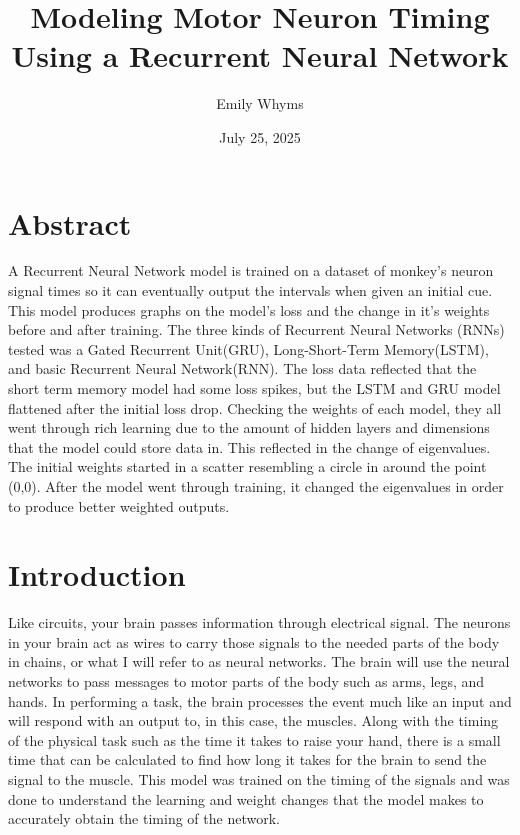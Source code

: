 \documentclass{article}
\title{\bf \fontsize{25 pt}{25 pt} Modeling Motor Neuron Timing Using a Recurrent Neural Network}
\author{Emily Whyms}
\date{July 25, 2025}
\begin{document}
\maketitle

\section{Abstract\centering}
A Recurrent Neural Network model is trained on a dataset\cite{Wang2018} of monkey's neuron signal times so it can eventually output the intervals when given an initial cue. This model produces graphs on the model's loss and the change in it's weights before and after training. The three kinds of Recurrent Neural Networks (RNNs) tested was a Gated Recurrent Unit(GRU), Long-Short-Term Memory(LSTM), and basic Recurrent Neural Network(RNN). The loss data reflected that the short term memory model had some loss spikes, but the LSTM and GRU model flattened after the initial loss drop. Checking the weights of each model, they all went through rich learning due to the amount of hidden layers and dimensions that the model could store data in. This reflected in the change of eigenvalues. The initial weights started in a scatter resembling a circle in around the point (0,0). After the model went through training, it changed the eigenvalues in order to produce better weighted outputs.
\section{Introduction\centering}
Like circuits, your brain passes information through electrical signal. The neurons in your brain act as wires to carry those signals to the needed parts of the body in chains, or what I will refer to as neural networks. The brain will use the neural networks to pass messages to motor parts of the body such as arms, legs, and hands. In performing a task, the brain processes the event much like an input and will respond with an output to, in this case, the muscles\cite{ScottS2004}. Along with the timing of the physical task such as the time it takes to raise your hand, there is a small time that can be calculated to find how long it takes for the brain to send the signal to the muscle\cite{Churchland2006}. This model was trained on the timing of the signals and was done to understand the learning and weight changes that the model makes to accurately obtain the timing of the network. \cite{Wang2018}
\end{document}
